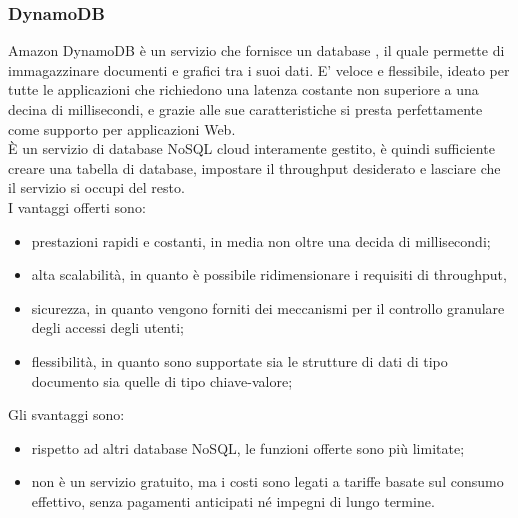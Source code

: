 \subsubsection{DynamoDB}
Amazon DynamoDB è un servizio che fornisce un database , il quale permette di immagazzinare documenti e grafici tra i suoi dati. E' veloce e flessibile, ideato per tutte le applicazioni che richiedono una latenza costante non superiore a una decina di millisecondi, e grazie alle sue caratteristiche si presta perfettamente come supporto per applicazioni Web.\\
È un servizio di database NoSQL cloud interamente gestito, è quindi sufficiente creare una tabella di database, impostare il throughput desiderato e lasciare che il servizio si occupi del resto. \\
I vantaggi offerti sono:
\begin{itemize}
	\item prestazioni rapidi e costanti, in media non oltre una decida di millisecondi;
	\item alta scalabilità, in quanto è possibile ridimensionare i requisiti di throughput,
	\item sicurezza, in quanto vengono forniti dei meccanismi per il controllo granulare degli accessi degli utenti;
	\item flessibilità, in quanto sono supportate sia le strutture di dati di tipo documento sia quelle di tipo chiave-valore;
\end{itemize}
Gli svantaggi sono:
\begin{itemize}
  \item rispetto ad altri database NoSQL, le funzioni offerte sono più limitate;
	\item non è un servizio gratuito, ma i costi sono legati a tariffe basate sul consumo effettivo, senza pagamenti anticipati né impegni di lungo termine.
\end{itemize}
